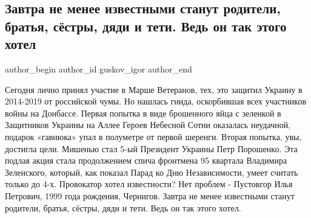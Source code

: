  
 
 
 
 
 
\subsection{Завтра не менее известными станут родители, братья, сёстры, дяди и тети. Ведь он так этого хотел}
\label{sec:24_08_2021.fb.guskov_igor.1.marsh_veteranov_nezalezhnist}
 
\ifcmt
 author_begin
   author_id guskov_igor
 author_end
\fi

Сегодня лично принял участие в Марше Ветеранов, тех, это защитил Украину в
2014-2019 от российской чумы. Но нашлась гнида, оскорбившая всех участников
войны на Донбассе. Первая попытка в виде брошенного яйца с зеленкой в
Защитников Украины на Аллее Героев Небесной Сотни оказалась неудачной, подарок
«гавнюка» упал в полуметре от первой шеренги. Вторая попытка, увы, достигла
цели. Мишенью стал 5-ый Президент Украины Петр Порошенко. Эта подлая акция
стала продолжением спича фронтмена 95 квартала Владимира Зеленского, который,
как показал Парад ко Дню Независимости, умеет считать только до 4-х. Провокатор
хотел известности? Нет проблем - Пустовгор Илья Петрович, 1999 года рождения,
Чернигов. Завтра не менее известными станут родители, братья, сёстры, дяди и
тети. Ведь он так этого хотел.

